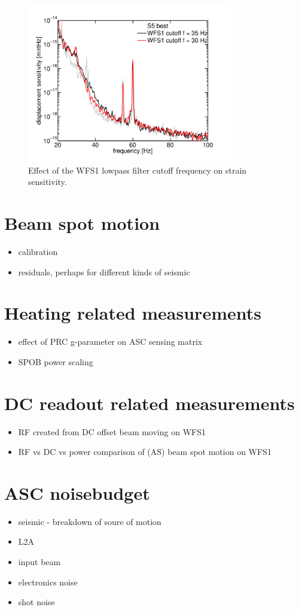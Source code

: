 \begin{figure}
\begin{centering}
\includegraphics[width=0.8\textwidth]{figures/cutoffWFS1_DARM.pdf}
\caption{Effect of the WFS1 lowpass filter cutoff frequency on strain sensitivity.}
\label{fig:WFS1cutoff}
\end{centering}
\end{figure}







\section{Beam spot motion}
\begin{itemize} 
\item calibration
\item residuals, perhaps for different kinds of seismic
\end{itemize}


\section{Heating related measurements}
\begin{itemize} 
\item effect of PRC g-parameter on ASC sensing matrix
\item SPOB power scaling
\end{itemize}

\section{DC readout related measurements}
\begin{itemize}
\item RF created from DC offset beam moving on WFS1
\item RF vs DC vs power comparison of (AS) beam spot motion on WFS1
\end{itemize}

\section{ASC noisebudget}
\begin{itemize}
\item seismic - breakdown of soure of motion
\item L2A
\item input beam 
\item electronics noise
\item shot noise
\end{itemize}



